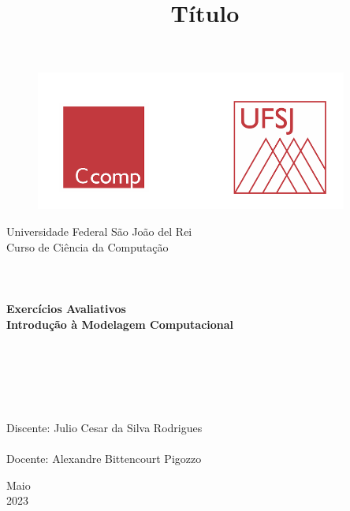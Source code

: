 \documentclass[a4paper, 12pt]{article}
\begin{document}

\begin{titlepage}
	\begin{center}
	
	\begin{figure}[ht]
    \centering
    \includegraphics[width=.44\textwidth]{Images/LogoUFSJ.PNG}
    \label{fig:Capturar.PNG}
    \end{figure}

    	\Huge{Universidade Federal São João del Rei}\\
		\Large{Curso de Ciência da Computação}\\ 

        \vspace{110pt}
        \textbf{\LARGE{
        \\
        \\
        \\
        Exercícios Avaliativos\\
        \vspace{0.5cm}
        \Large{Introdução à Modelagem Computacional}
        \\
        \\
        \\
        }}
        
		\title{{\large{Título}}}
		\vspace{2.5cm}
	\end{center}
	    
    \begin{flushleft}
		\begin{tabbing}
		\\
		\\
		\\	
		\large{Discente: Julio Cesar da Silva Rodrigues}\\
	    \\
		\large{Docente: Alexandre Bittencourt Pigozzo}\\
	    \end{tabbing}
    \end{flushleft}
	\vspace{1cm}
	
	\begin{center}
		\vspace{\fill}
			Maio\\
		    2023
	\end{center}
\end{titlepage}
\end{document}
